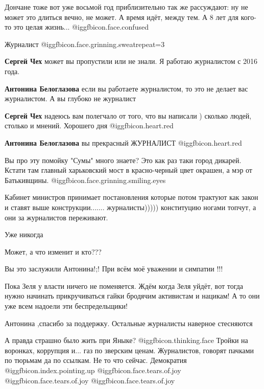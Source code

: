 \begin{itemize}
Дончане тоже вот уже восьмой год приблизительно так же рассуждают: ну не может
это длиться вечно, не может. А время идёт, между тем. А 8 лет для кого-то это
целая жизнь...  @igg{fbicon.face.confused} 


Журналист @igg{fbicon.face.grinning.sweat}{repeat=3} 

\begin{itemize} %
\textbf{Сергей Чех} может вы пропустили или не знали. Я работаю журналистом с 2016 года.

\textbf{Антонина Белоглазова} если вы работаете журналистом, то это не делает вас журналистом. А вы глубоко не журналист


\textbf{Сергей Чех} надеюсь вам полегчало от того, что вы написали ) сколько людей, столько и мнений. Хорошего дня
	@igg{fbicon.heart.red}

\textbf{Антонина Белоглазова} вы прекрасный ЖУРНАЛИСТ @igg{fbicon.heart.red}

\end{itemize} %


Вы про эту помойку "Сумы" много знаете? Это как раз таки город дикарей. Кстати
там главный харьковский мост в красно-черный цвет окрашен, а мэр от
Батькивщины.  @igg{fbicon.face.grinning.smiling.eyes} 


Кабинет министров принимает постановления которые потом трактуют как закон и
ставят выше конструкции....... журналисты))))) конституцию ногами топчут, а они
за журналистов переживают.

Уже никогда

Может, а что изменит и кто???

Вы это заслужили Антонина!;! При всём моё уважении и симпатии !!!

Пока Зеля у власти ничего не поменяется.
Ждём когда Зеля уйдёт, вот тогда нужно начинать прикручиваться гайки бродячим активистам и нацикам!
А то они уже всем надоели эти беспредельщики!

Антонина ,спасибо за поддержку. Остальные журналисты наверное стесняются


А правда страшно было жить при Яныке?  @igg{fbicon.thinking.face}  Тройки на воронках, коррупция и... газ
по зверским ценам. Журналистов, говорят пачками по тюрьмам да по ссылкам. Не то
что сейчас. Демократия @igg{fbicon.index.pointing.up}  @igg{fbicon.face.tears.of.joy}   @igg{fbicon.face.tears.of.joy}   @igg{fbicon.face.tears.of.joy} 


\end{itemize}
